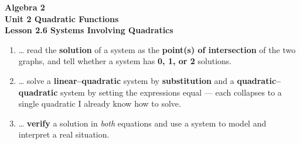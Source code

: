 \documentclass[10pt]{article}
\begin{document}
\vspace{-0.8in}

\begin{center}
  {\color{white}\textbf{\LARGE Algebra 2}}\\[4pt]
  {\color{forestmid}\large\textbf{Unit 2 \quad Quadratic Functions}}\\[6pt]
  {\color{white}\textbf{\large Lesson 2.6 \quad Systems Involving Quadratics}}
\end{center}

\vspace{0.22in}
\namedateperiod
\vspace{0.18in}

\begin{learningtargetbox}
\small
\begin{enumerate}[leftmargin=1.5em, itemsep=5pt]
  \item \ldots{} read the \textbf{solution} of a system as the \textbf{point(s) of intersection} of the two graphs, and tell whether a system has \textbf{0, 1, or 2} solutions.
  \item \ldots{} solve a \textbf{linear--quadratic} system by \textbf{substitution} and a \textbf{quadratic--quadratic} system by setting the expressions equal --- each collapses to a single quadratic I already know how to solve.
  \item \ldots{} \textbf{verify} a solution in \emph{both} equations and use a system to model and interpret a real situation.
\end{enumerate}
\end{learningtargetbox}

\vspace{0.14in}
\end{document}
